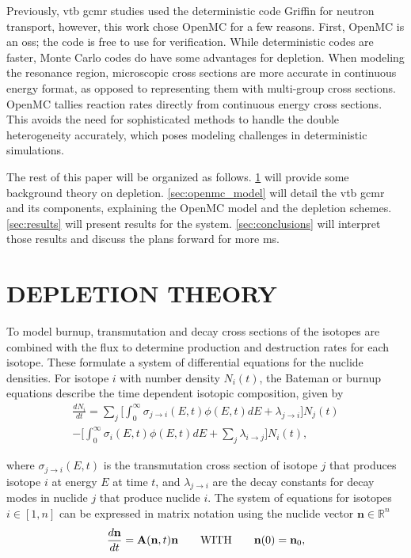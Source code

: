 \documentclass[letterpaper]{physor2024}
\begin{document}
Previously, \gls{vtb} \gls{gcmr} studies used the deterministic code Griffin for neutron transport, however, this work chose OpenMC for a few reasons. First, OpenMC is an \gls{oss}; the code is free to use for verification. While deterministic codes are faster, Monte Carlo codes do have some advantages for depletion. When modeling the resonance region, microscopic cross sections are more accurate in continuous energy format, as opposed to representing them with multi-group cross sections. OpenMC tallies reaction rates directly from continuous energy cross sections. This avoids the need for sophisticated methods to handle the double heterogeneity accurately, which poses modeling challenges in deterministic simulations.

The rest of this paper will be organized as follows. \cref{sec:depletion} will provide some background theory on depletion. \cref{sec:openmc_model}  will detail the \gls{vtb} \gls{gcmr} and its components, explaining the OpenMC model and the depletion schemes. \cref{sec:results} will present results for the system. \cref{sec:conclusions} will interpret those results and discuss the plans forward for more \gls{ms}.

\section{DEPLETION THEORY}\label{sec:depletion}
To model burnup, transmutation and decay cross sections of the isotopes are combined with the flux to determine production and destruction rates for each isotope. These formulate a system of differential equations for the nuclide densities. For isotope $i$ with number density $N_{i}(t)$, the Bateman or burnup equations describe the time dependent isotopic composition, given by
\vspace*{-0.1cm}
\begin{multline} \label{eq:batemen}
    \frac{dN_{i}}{dt} =
    \sum_{j} \bigg[\int_{0}^{\infty} \sigma_{j\rightarrow{i}}(E,t)\phi(E,t)dE + \lambda_{j\rightarrow{i}}\bigg]N_{j}(t) \\
    -\bigg[\int_{0}^{\infty} \sigma_{i}(E,t)\phi(E,t)dE
    +\sum_{j}\lambda_{i\rightarrow{j}}\bigg] N_{i}(t),
\end{multline}

\noindent where $\sigma_{j\rightarrow{i}}(E,t)$ is the transmutation cross section of isotope $j$ that produces isotope $i$ at energy $E$ at time $t$, and $\lambda_{j\rightarrow{i}}$ are the decay constants for decay modes in nuclide $j$ that produce nuclide $i$. The system of equations for isotopes $i\in[1,n]$ can be expressed in matrix notation using the nuclide vector $\mathbf{n}\in\mathbb{R}^{n}$
\begin{equation} \label{eq:burnup matrix odes}
    \frac{d\textbf{n}}{dt} =
    \textbf{A}(\textbf{n},t) \textbf{n}
    \qquad \text{WITH} \qquad
    \textbf{n}(0) = \textbf{n}_{0},
\end{equation}
\end{document}
